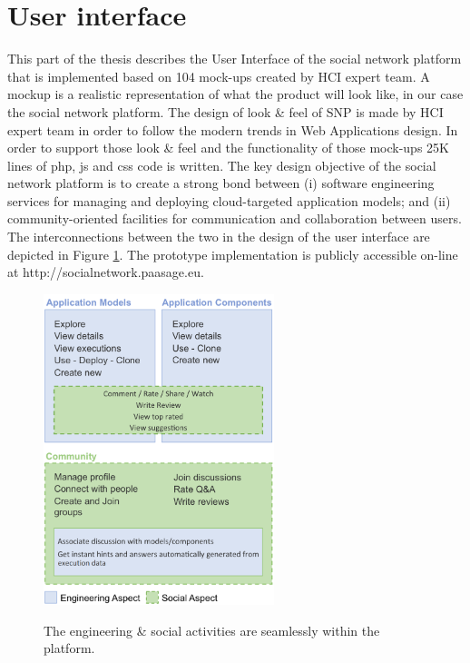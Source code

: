 \section{User interface}
This part of the thesis describes the User Interface of the social network platform that is implemented based on 104 mock-ups created by HCI expert team. A mockup is a realistic representation of what the product will look like, in our case the social network platform. The design of look \& feel of SNP is made by HCI expert team in order to follow the modern trends in Web Applications design. In order to support those look \& feel and the functionality of those mock-ups 25K lines of php, js and css code is written.
The key design objective of the social network platform is to create a strong bond between (i) software engineering services for managing and deploying cloud-targeted application models; and (ii) community-oriented facilities for communication and
collaboration between users. The interconnections between the two in the design of the user interface are depicted in Figure \ref{fig:two_aspects}.
The prototype implementation is publicly accessible on-line at http://socialnetwork.paasage.eu. 

\begin{figure}[h]
	\caption{The engineering \& social activities are seamlessly within the platform.}
	\includegraphics[width=0.6\textwidth,natwidth=200,natheight=150]{./fig/two_aspectes.png}
	\centering
	\label{fig:two_aspects}
\end{figure}

